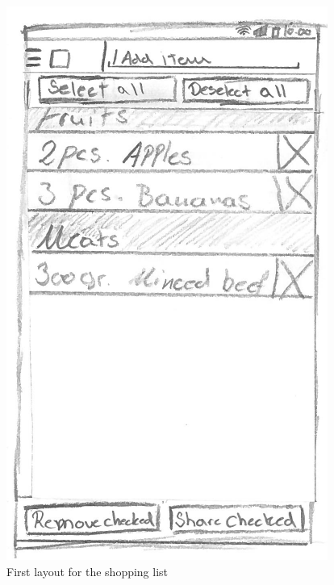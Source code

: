 \begin{figure}[H]
\begin{minipage}[b]{0.5\columnwidth}
\centering
\includegraphics[width=0.7\columnwidth]{img/prototypes/shopping_list_old.pdf}
\caption{First layout for the shopping list\label{fig:shoppingold}}
\end{minipage}
\hspace{0.5cm}
\begin{minipage}[b]{0.5\columnwidth}
\centering

\end{minipage}
\end{figure}
